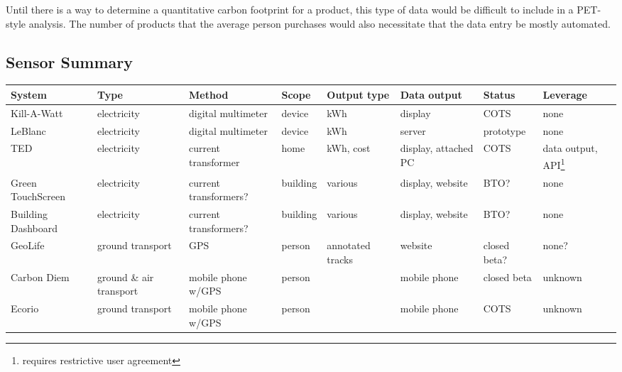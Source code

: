Until there is a way to determine a quantitative carbon footprint for a product, this type of data would be difficult to include in a PET-style analysis. The number of products that the average person purchases would also necessitate that the data entry be mostly automated.

\subsection{Sensor Summary}

\begin{table}[htbp]
	\begin{center}
		\begin{minipage}{\textwidth}
		\scriptsize
		\begin{tabular}{| p{2.2cm} || p{1.5cm} | p{2cm} | l | p{1.5cm} | p{1.6cm} | p{1.5cm} | p{1.5cm} |}
			\hline
			System & Type & Method & Scope & Output type & Data output & Status & Leverage \\ \hline \hline
			
			Kill-A-Watt & electricity & digital multimeter & device & kWh & display & COTS & none \\ \hline
			
			LeBlanc & electricity & digital multimeter & device & kWh & server & prototype & none \\ \hline
			
			TED & electricity & current transformer & home & kWh, cost & display, attached PC & COTS & data output, API\footnote{requires restrictive user agreement} \\ \hline
			
			Green TouchScreen & electricity & current transformers? & building & various & display, website & BTO? & none \\ \hline
			
			Building Dashboard & electricity & current transformers? & building & various & display, website & BTO? & none \\ \hline
			
			GeoLife & ground transport & GPS & person & annotated tracks & website & closed beta? & none? \\ \hline
			
			Carbon Diem & ground \& air transport & mobile phone w/GPS & person & \COtwo & mobile phone & closed beta & unknown \\ \hline
			
			Ecorio & ground transport & mobile phone w/GPS & person & \COtwo & mobile phone & COTS & unknown \\ \hline
			

\end{tabular}
\end{minipage}
\end{center}
\end{table}
